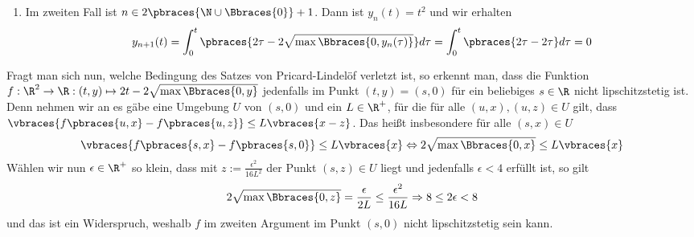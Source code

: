\begin{solution}
\begin{enumerate}[label = \alph*)]
\begin{enumerate}[label = \roman*)]
            \item Im zweiten Fall ist $n \in 2 \pbraces{\N \cup \Bbraces{0}} + 1$. Dann ist $y_n(t) = t^2$ und wir erhalten
            \begin{align*}
                y_{n+1}(t) = \int_0^t \pbraces{2\tau - 2 \sqrt{\max\Bbraces{0, y_n(\tau)}}} d\tau = \int_0^t \pbraces{2\tau - 2\tau} d\tau = 0
            \end{align*}
        \end{enumerate}
        Fragt man sich nun, welche Bedingung des Satzes von Pricard-Lindelöf verletzt ist, so erkennt man, dass die Funktion $f: \R^2 \to \R: (t,y) \mapsto 2t - 2\sqrt{\max\Bbraces{0,y}}$ jedenfalls im Punkt $(t,y) = (s,0)$ für ein beliebiges $s \in \R$ nicht lipschitzstetig ist. Denn nehmen wir an es gäbe eine Umgebung $U$ von $(s,0)$ und ein $L \in \R^+$, für die für alle $(u,x), (u,z) \in U$ gilt, dass $\vbraces{f\pbraces{u,x}- f\pbraces{u,z}} \leq L\vbraces{x - z}$. Das heißt insbesondere für alle $(s,x) \in U$
        \begin{align*}
            \vbraces{f\pbraces{s,x}- f\pbraces{s,0}} \leq L\vbraces{x} \Leftrightarrow 2\sqrt{\max\Bbraces{0, x}} \leq L\vbraces{x}
        \end{align*}
        Wählen wir nun $\epsilon \in \R^+$ so klein, dass mit $z := \frac{\epsilon^2}{16L^2}$ der Punkt $(s, z) \in U$ liegt und jedenfalls $\epsilon < 4$ erfüllt ist, so gilt 
        \begin{align*}
            2\sqrt{\max\Bbraces{0, z}} = \frac{\epsilon}{2L} \leq \frac{\epsilon^2}{16 L} \Rightarrow 8 \leq 2\epsilon < 8
        \end{align*}
        und das ist ein Widerspruch, weshalb $f$ im zweiten Argument im Punkt $(s,0)$ nicht lipschitzstetig sein kann.
    \end{enumerate}
    
\end{solution}